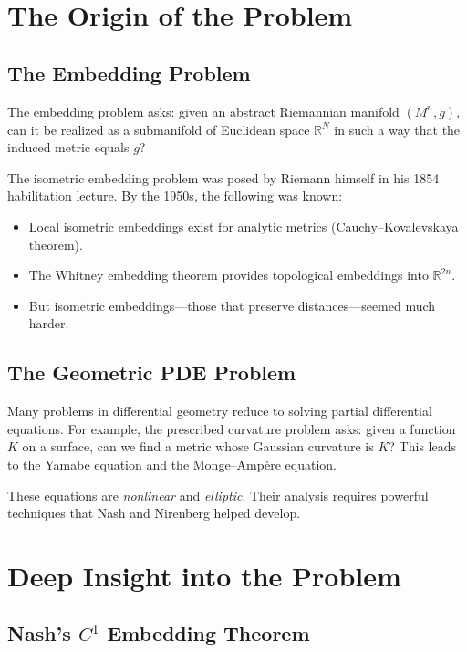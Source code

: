 \section{The Origin of the Problem}

\subsection{The Embedding Problem}

The embedding problem asks: given an abstract Riemannian manifold $(M^n, g)$, can it be realized as a submanifold of Euclidean space $\mathbb{R}^N$ in such a way that the induced metric equals $g$?

The isometric embedding problem was posed by Riemann himself in his 1854 habilitation lecture. By the 1950s, the following was known:
\begin{itemize}
\item Local isometric embeddings exist for analytic metrics (Cauchy--Kovalevskaya theorem).
\item The Whitney embedding theorem provides topological embeddings into $\mathbb{R}^{2n}$.
\item But isometric embeddings---those that preserve distances---seemed much harder.
\end{itemize}

\subsection{The Geometric PDE Problem}

Many problems in differential geometry reduce to solving partial differential equations. For example, the prescribed curvature problem asks: given a function $K$ on a surface, can we find a metric whose Gaussian curvature is $K$? This leads to the Yamabe equation and the Monge--Amp\`ere equation.

These equations are \emph{nonlinear} and \emph{elliptic}. Their analysis requires powerful techniques that Nash and Nirenberg helped develop.

\section{Deep Insight into the Problem}

\subsection{Nash's $C^1$ Embedding Theorem}

